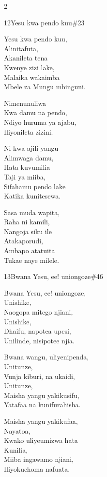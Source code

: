 \begin{multicols}{2}
\begin{hymn}{12}{Yesu kwa pendo kuu}{\#23}
\begin{stanza}
Yesu kwa pendo kuu,\\
Alinitafuta,\\
Akanileta tena\\
Kwenye zizi lake,\\
Malaika wakaimba\\
Mbele za Mungu mbinguni.
\end{stanza}
\begin{chorus}
Nimenunuliwa\\
Kwa damu na pendo,\\
Ndiyo huruma ya ajabu,\\
Iliyonileta zizini.
\end{chorus}
\begin{stanza}
Ni kwa ajili yangu\\
Alimwaga damu,\\
Hata kuvumilia\\
Taji ya miiba,\\
Sifahamu pendo lake\\
Katika kunitesewa.
\end{stanza}
\begin{stanza}
Sasa muda wapita,\\
Raha ni kamili,\\
Nangoja siku ile\\
Atakaporudi,\\
Ambapo atatuita\\
Tukae naye milele.
\end{stanza}
\end{hymn}

\begin{hymn}{13}{Bwana Yesu, ee! uniongoze}{\#46}
\begin{stanza}
Bwana Yesu, ee! uniongoze,\\
Unishike,\\
Naogopa mitego njiani,\\
Unishike,\\
Dhaifu, napotea upesi,\\
Unilinde, nisipotee njia.
\end{stanza}
\begin{stanza}
Bwana wangu, uliyenipenda,\\
Unitunze,\\
Vunja kiburi, na ukaidi,\\
Unitunze,\\
Maisha yangu yakikusifu,\\
Yatafaa na kunifurahisha.
\end{stanza}
\begin{stanza}
Maisha yangu yakikufaa,\\
Nayatoa,\\
Kwako uliyeumizwa hata\\
Kunifia,\\
Miiba ingawamo njiani,\\
Iliyokuchoma nafuata.
\end{stanza}
\end{hymn}


\end{multicols}
